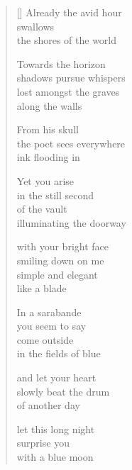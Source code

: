 \documentclass[12pt,a4paper]{article}
\begin{document}
\begin{verse}[\versewidth]
  Already the avid hour \\
  swallows \\
  the shores of the world

  Towards the horizon \\
  shadows pursue whispers \\
  lost amongst the graves \\
  along the walls

  From his skull \\
  the poet sees everywhere \\
  ink flooding in

  Yet you arise \\
  in the still second \\
  of the vault \\
  illuminating the doorway

  with your bright face \\
  smiling down on me \\
  simple and elegant \\
  like a blade

  In a sarabande \\
  you seem to say \\
  come outside \\
  in the fields of blue

  and let your heart \\
  slowly beat the drum \\
  of another day

  let this long night \\
  surprise you \\
  with a blue moon
\end{verse}


\newpage

\poemtitle{}

\settowidth{\versewidth}{my lips still reach for the heavens}

\bigskip
\end{document}
